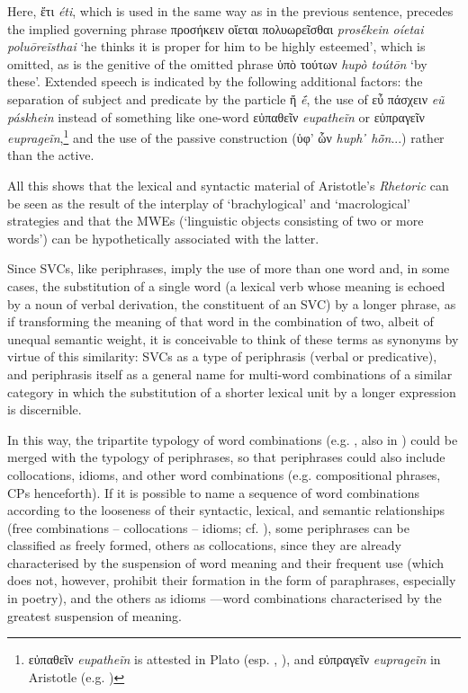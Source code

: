 \documentclass[output=paper,colorlinks,citecolor=brown]{langscibook}
\begin{document}
Here, ἔτι \textit{éti}, which is used in the same way as in the previous sentence, precedes the implied governing phrase προσήκειν οἴεται πολυωρεῖσθαι \textit{prosḗkein oíetai poluōreĩsthai} ‘he thinks it is proper for him to be highly esteemed', which is omitted, as is the genitive of the omitted phrase ὑπὸ τούτων \textit{hupò toútōn} ‘by these'. Extended speech is indicated by the following additional factors: the separation of subject and predicate by the particle ἤ \textit{ḗ}, the use of εὖ πάσχειν \textit{eũ páskhein} instead of something like one-word εὐπαθεῖν \textit{eupatheĩn} or εὐπραγεῖν \textit{euprageĩn},\footnote{εὐπαθεῖν \textit{eupatheĩn} is attested in Plato (esp. , ), and εὐπραγεῖν \textit{euprageĩn} in Aristotle (e.g. )} and the use of the passive construction (ὑφ’ ὧν \textit{huph᾽ hō̃n}...) rather than the active.

All this shows that the lexical and syntactic material of Aristotle’s \textit{Rhetoric} can be seen as the result of the interplay of ‘brachylogical’ and ‘macrological’ strategies and that the MWEs (‘linguistic objects consisting of two or more words') can be hypothetically associated with the latter.

Since SVCs, like periphrases, imply the use of more than one word and, in some cases, the substitution of a single word (a lexical verb whose meaning is echoed by a noun of verbal derivation, the constituent of an SVC) by a longer phrase, as if transforming the meaning of that word in the combination of two, albeit of unequal semantic weight, it is conceivable to think of these terms as synonyms by virtue of this similarity: SVCs as a type of periphrasis (verbal or predicative), and periphrasis itself as a general name for multi-word combinations of a similar category in which the substitution of a shorter lexical unit by a longer expression is discernible. 


In this way, the tripartite typology of word combinations (e.g. \citealt{VanderMeer1998}, also in \citealt{Marcinkeviciene2010}) could be merged with the typology of periphrases, so that periphrases could also include collocations, idioms, and other word combinations (e.g. compositional phrases, CPs henceforth). If it is possible to name a sequence of word combinations according to the looseness of their syntactic, lexical, and semantic relationships (free combinations – collocations – idioms; cf. \citealt[88]{Marcinkeviciene2010}), some periphrases can be classified as freely formed, others as collocations, since they are already characterised by the suspension of word meaning and their frequent use (which does not, however, prohibit their formation in the form of paraphrases, especially in poetry), and the others as idioms —word combinations characterised by the greatest suspension of meaning.
\end{document}
